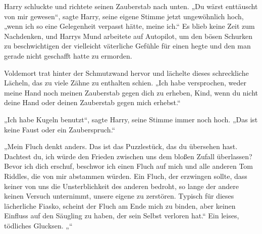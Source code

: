 Harry schluckte und richtete seinen Zauberstab nach unten.
„Du wärst enttäuscht von mir gewesen“, sagte Harry, seine eigene Stimme jetzt ungewöhnlich hoch, „wenn ich so eine Gelegenheit verpasst hätte, meine ich.“
Es blieb keine Zeit zum Nachdenken, und Harrys Mund arbeitete auf Autopilot, um den bösen Schurken zu beschwichtigen der vielleicht väterliche Gefühle für einen hegte und den man gerade nicht geschafft hatte zu ermorden.

Voldemort trat hinter der Schmutzwand hervor und lächelte dieses schreckliche Lächeln, das zu viele Zähne zu enthalten schien.
„Ich habe versprochen, weder meine Hand noch meinen Zauberstab gegen dich zu erheben, Kind, wenn du nicht deine Hand oder deinen Zauberstab gegen mich erhebst.“

„Ich habe Kugeln benutzt“, sagte Harry, seine Stimme immer noch hoch. „Das ist keine Faust oder ein Zauberspruch.“

„Mein Fluch denkt anders. Das ist das Puzzlestück, das du übersehen hast. Dachtest du, ich würde den Frieden zwischen uns dem bloßen Zufall überlassen? Bevor ich dich erschuf, beschwor ich einen Fluch auf mich und alle anderen Tom Riddles, die von mir abstammen würden. Ein Fluch, der erzwingen sollte, dass keiner von uns die Unsterblichkeit des anderen bedroht, so lange der andere keinen Versuch unternimmt, unsere eigene zu zerstören. Typisch für dieses lächerliche Fiasko, scheint der Fluch am Ende mich zu binden, aber keinen Einfluss auf den Säugling zu haben, der sein Selbst verloren hat.“
Ein leises, tödliches Glucksen.
„“

